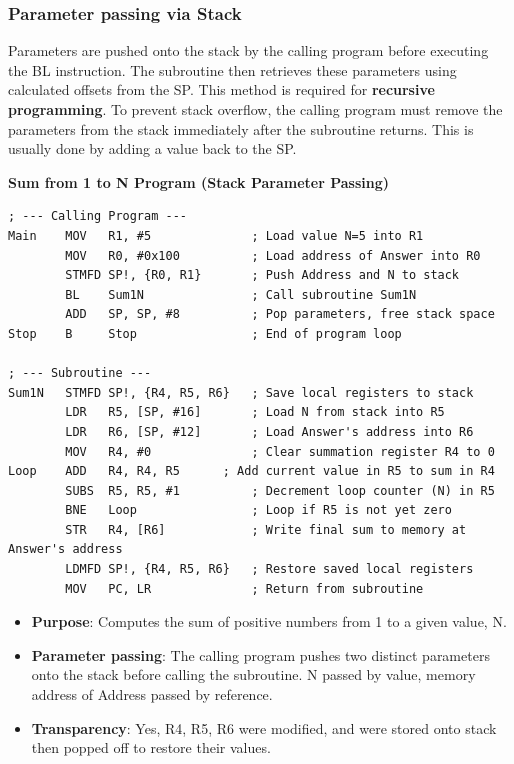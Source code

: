 \documentclass[../comorg-part1.tex]{subfiles}
\begin{document}
\noindent
\begin{minipage}{\textwidth}
\subsubsection{Parameter passing via Stack}
Parameters are pushed onto the stack by the calling program before executing the BL instruction. The subroutine then retrieves these parameters using calculated offsets from the SP.\newline
This method is required for \textbf{recursive programming}.\newline
To prevent stack overflow, the calling program must remove the parameters from the stack immediately after the subroutine returns. This is usually done by adding a value back to the SP.\newline

\noindent\textbf{Sum from 1 to N Program (Stack Parameter Passing)}
\begin{lstlisting}
; --- Calling Program ---
Main    MOV   R1, #5              ; Load value N=5 into R1
        MOV   R0, #0x100          ; Load address of Answer into R0
        STMFD SP!, {R0, R1}       ; Push Address and N to stack
        BL    Sum1N               ; Call subroutine Sum1N
        ADD   SP, SP, #8          ; Pop parameters, free stack space
Stop    B     Stop                ; End of program loop

; --- Subroutine ---
Sum1N   STMFD SP!, {R4, R5, R6}   ; Save local registers to stack
        LDR   R5, [SP, #16]       ; Load N from stack into R5
        LDR   R6, [SP, #12]       ; Load Answer's address into R6
        MOV   R4, #0              ; Clear summation register R4 to 0
Loop    ADD   R4, R4, R5      ; Add current value in R5 to sum in R4
        SUBS  R5, R5, #1          ; Decrement loop counter (N) in R5
        BNE   Loop                ; Loop if R5 is not yet zero
        STR   R4, [R6]            ; Write final sum to memory at Answer's address
        LDMFD SP!, {R4, R5, R6}   ; Restore saved local registers
        MOV   PC, LR              ; Return from subroutine
\end{lstlisting}
\begin{itemize}
    \item \textbf{Purpose}: Computes the sum of positive numbers from 1 to a given value, N.
    \item \textbf{Parameter passing}: The calling program pushes two distinct parameters onto the stack before calling the subroutine.\newline
    N passed by value, memory address of Address passed by reference.
    \item \textbf{Transparency}: Yes, R4, R5, R6 were modified, and were stored onto stack then popped off to restore their values.
\end{itemize}
\end{minipage}
\end{document}
